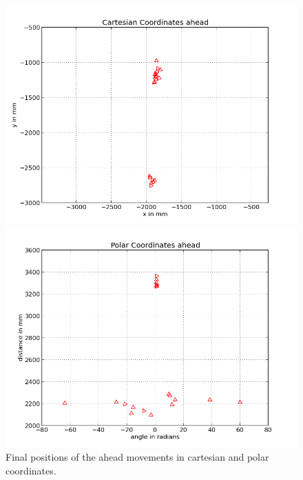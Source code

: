 \documentclass{scrartcl}
\begin{document}
\begin{figure}[H]
\centering
\begin{minipage}{.5\textwidth}
  \centering
  \includegraphics[width=.8\linewidth]{img/ahead_f.png}
\end{minipage}%
\begin{minipage}{.5\textwidth}
  \centering
  \includegraphics[width=.8\linewidth]{img/ahead_pc_f.png}
\end{minipage}
\caption{Final positions of the ahead movements in cartesian and polar coordinates.}
\label{fig:ahead_f}
\end{figure}
\end{document}
